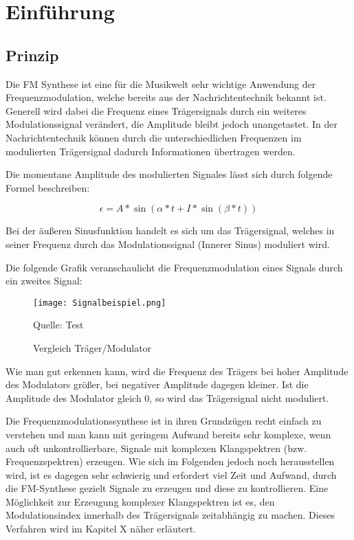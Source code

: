 \section{Einführung}

\subsection{Prinzip}

Die FM Synthese ist eine für die Musikwelt sehr wichtige Anwendung der Frequenzmodulation, welche bereits aus der Nachrichtentechnik bekannt ist. Generell wird dabei die Frequenz eines Trägersignals durch ein weiteres Modulationssignal verändert, die Amplitude bleibt jedoch unangetastet. In der Nachrichtentechnik können durch die unterschiedlichen Frequenzen im modulierten Trägersignal dadurch Informationen übertragen werden. 

Die momentane Amplitude des modulierten Signales lässt sich durch folgende Formel beschreiben:

\[
\epsilon = A*\sin(\alpha*t + I*\sin(\beta*t)) 
\]

Bei der äußeren Sinusfunktion handelt es sich um das Trägersignal, welches in seiner Frequenz durch das Modulationssignal (Innerer Sinus) moduliert wird.


Die folgende Grafik veranschaulicht die Frequenzmodulation eines Signals durch ein zweites Signal:

\begin{figure} [ht]
\centering
  \texttt{[image: Signalbeispiel.png]}
\caption{Vergleich Träger/Modulator}
Quelle: Test
\end{figure}

Wie man gut erkennen kann, wird die Frequenz des Trägers bei hoher Amplitude des Modulators größer, bei negativer Amplitude dagegen kleiner. Ist die Amplitude des Modulator gleich 0, so wird das Trägersignal nicht moduliert.

Die Frequenzmodulationssynthese ist in ihren Grundzügen recht einfach zu verstehen und man kann mit geringem  Aufwand bereits sehr komplexe, wenn auch oft unkontrollierbare, Signale mit komplexen Klangspektren (bzw. Frequenzspektren) erzeugen. Wie sich im Folgenden jedoch noch herausstellen wird, ist es dagegen sehr schwierig und erfordert viel Zeit und Aufwand, durch die FM-Synthese gezielt Signale zu erzeugen und diese zu kontrollieren. Eine Möglichkeit zur Erzeugung komplexer Klangspektren ist es, den Modulationsindex innerhalb des Trägersignals zeitabhängig zu machen. Dieses Verfahren wird im Kapitel X näher erläutert.

